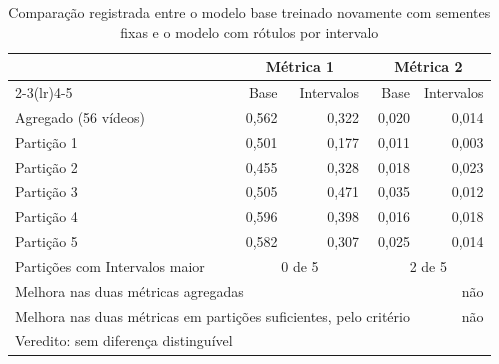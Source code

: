 \begin{table}[htbp]
\centering
\small
\caption{Comparação registrada entre o modelo base treinado novamente com sementes fixas e o modelo com rótulos por intervalo}
\label{tab:comparacao}
\begin{tabular}{lrrrr}
\toprule
 & \multicolumn{2}{c}{Métrica 1} & \multicolumn{2}{c}{Métrica 2} \\
\cmidrule(lr){2-3}\cmidrule(lr){4-5}
 & Base & Intervalos & Base & Intervalos \\
\midrule
Agregado (56 vídeos) & 0,562 & 0,322 & 0,020 & 0,014 \\
\midrule
Partição 1 & 0,501 & 0,177 & 0,011 & 0,003 \\
Partição 2 & 0,455 & 0,328 & 0,018 & 0,023 \\
Partição 3 & 0,505 & 0,471 & 0,035 & 0,012 \\
Partição 4 & 0,596 & 0,398 & 0,016 & 0,018 \\
Partição 5 & 0,582 & 0,307 & 0,025 & 0,014 \\
Partições com Intervalos maior & \multicolumn{2}{c}{0 de 5} & \multicolumn{2}{c}{2 de 5} \\
\midrule
\multicolumn{4}{l}{Melhora nas duas métricas agregadas} & não \\
\multicolumn{4}{l}{Melhora nas duas métricas em partições suficientes, pelo critério} & não \\
\multicolumn{5}{l}{Veredito: sem diferença distinguível} \\
\bottomrule
\end{tabular}
\end{table}

